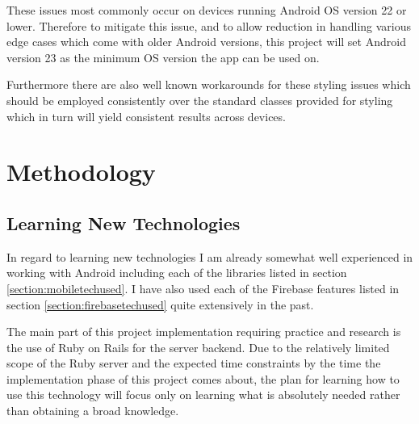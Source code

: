 These issues most commonly occur on devices running Android OS version 22 or lower. Therefore to mitigate this issue, and to allow reduction in handling various edge cases which come with older Android versions, this project will set Android version 23 as the minimum OS version the app can be used on.

Furthermore there are also well known workarounds for these styling issues which should be employed consistently over the standard classes provided for styling which in turn will yield consistent results across devices.

\section{Methodology}
\label{section:methodology}

\subsection{Learning New Technologies}

In regard to learning new technologies I am already somewhat well experienced in working with Android including each of the libraries listed in section \ref{section:mobiletechused}. I have also used each of the Firebase features listed in section \ref{section:firebasetechused} quite extensively in the past.

The main part of this project implementation requiring practice and research is the use of Ruby on Rails for the server backend. Due to the relatively limited scope of the Ruby server and the expected time constraints by the time the implementation phase of this project comes about, the plan for learning how to use this technology will focus only on learning what is absolutely needed rather than obtaining a broad knowledge. 

